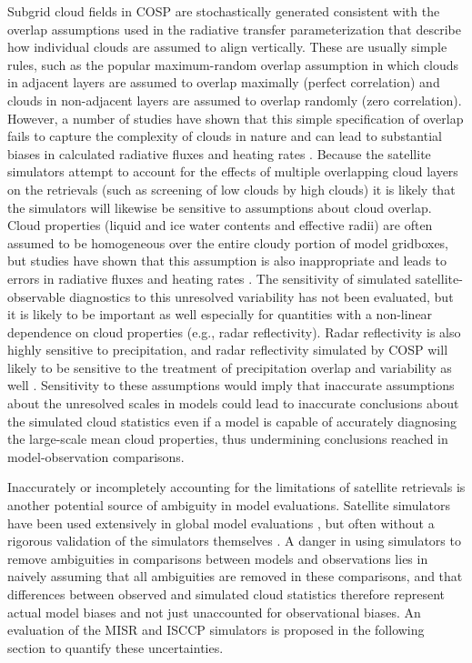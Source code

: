 \documentclass{article}
\begin{document}
Subgrid cloud fields in COSP are stochastically generated consistent with the overlap assumptions used in the radiative transfer parameterization that describe how individual clouds are assumed to align vertically. These are usually simple rules, such as the popular maximum-random overlap assumption \citep{geleyn_and_hollingsworth_1979} in which clouds in adjacent layers are assumed to overlap maximally (perfect correlation) and clouds in non-adjacent layers are assumed to overlap randomly (zero correlation). However, a number of studies have shown that this simple specification of overlap fails to capture the complexity of clouds in nature \citep[e.g.,][]{hogan_and_illingworth_2000,mace_and_benson-troth_2002,pincus_et_al_2005,barker_2008} and can lead to substantial biases in calculated radiative fluxes and heating rates \citep{barker_et_al_1999,oreopoulos_et_al_2012}. Because the satellite simulators attempt to account for the effects of multiple overlapping cloud layers on the retrievals (such as screening of low clouds by high clouds) it is likely that the simulators will likewise be sensitive to assumptions about cloud overlap. Cloud properties (liquid and ice water contents and effective radii) are often assumed to be homogeneous over the entire cloudy portion of model gridboxes, but studies have shown that this assumption is also inappropriate and leads to errors in radiative fluxes and heating rates \citep{barker_et_al_1999,oreopoulos_et_al_2012}. The sensitivity of simulated satellite-observable diagnostics to this unresolved variability has not been evaluated, but it is likely to be important as well especially for quantities with a non-linear dependence on cloud properties (e.g., radar reflectivity). Radar reflectivity is also highly sensitive to precipitation, and radar reflectivity simulated by COSP will likely to be sensitive to the treatment of precipitation overlap and variability as well \citep[e.g.,][]{dimichele_et_al_2012}. Sensitivity to these assumptions would imply that inaccurate assumptions about the unresolved scales in models could lead to inaccurate conclusions about the simulated cloud statistics even if a model is capable of accurately diagnosing the large-scale mean cloud properties, thus undermining conclusions reached in model-observation comparisons.

Inaccurately or incompletely accounting for the limitations of satellite retrievals is another potential source of ambiguity in model evaluations. Satellite simulators have been used extensively in global model evaluations \citep[e.g.,][]{kay_et_al_2012,klein_et_al_2013}, but often without a rigorous validation of the simulators themselves \citep{mace_et_al_2010}. A danger in using simulators to remove ambiguities in comparisons between models and observations lies in naively assuming that all ambiguities are removed in these comparisons, and that differences between observed and simulated cloud statistics therefore represent actual model biases and not just unaccounted for observational biases. An evaluation of the MISR and ISCCP simulators is proposed in the following section to quantify these uncertainties. 
\end{document}
